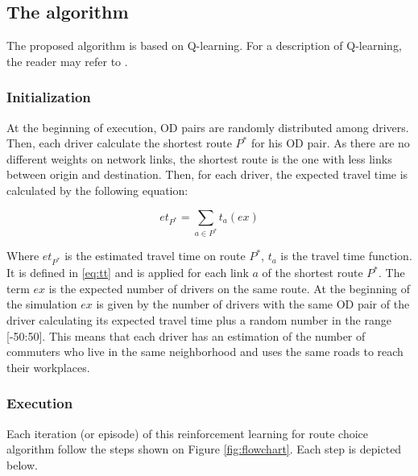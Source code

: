 \documentclass[12pt]{article}
\begin{document}
\subsection{The algorithm}

The proposed algorithm is based on Q-learning. For a description of Q-learning, the reader may refer to \cite{Watkins&Dayan1992}. 

\subsubsection{Initialization}
At the beginning of execution, OD pairs are randomly distributed among drivers. Then, each driver calculate the shortest route $P^*$ for his OD pair. As there are no different weights on network links, the shortest route is the one with less links between origin and destination. Then, for each driver, the expected travel time is calculated by the following equation:

\begin{equation}
\label{eq:ett}
et_{P^*} = \sum_{a \in P^*} t_a(ex)
\end{equation}

Where $et_{P^*}$ is the estimated travel time on route $P^*$, $t_a$ is the travel time function. It is defined in \eqref{eq:tt} and is applied for each link $a$ of the shortest route $P^*$. The term $ex$ is the expected number of drivers on the same route. At the beginning of the simulation $ex$ is given by the number of drivers with the same OD pair of the driver calculating its expected travel time plus a random number in the range [-50:50]. This means that each driver has an estimation of the number of commuters who live in the same neighborhood and uses the same roads to reach their workplaces.

\subsubsection{Execution}

Each iteration (or episode) of this reinforcement learning for route choice algorithm follow the steps shown on Figure \ref{fig:flowchart}. Each step is depicted below.
\end{document}
